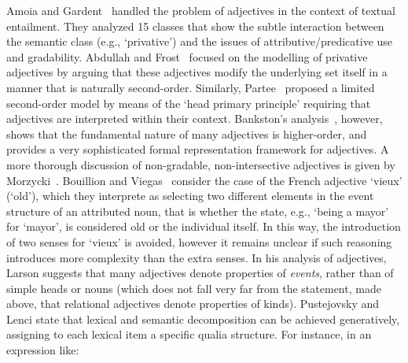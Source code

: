 \documentclass[11pt]{article}
\begin{document}
Amoia and Gardent~ handled the problem of adjectives in the context of textual entailment. They analyzed 15 classes that show the subtle interaction between the semantic class (e.g., `privative') and the issues of attributive/predicative use and gradability.  
Abdullah and Frost~ focused on the modelling of privative adjectives by arguing that these adjectives modify the underlying set itself in a manner that is naturally second-order. Similarly, Partee~ proposed a limited second-order model by means of the `head primary principle' requiring that adjectives are interpreted within their context. %
Bankston's analysis~, however, shows that the fundamental nature of many adjectives is higher-order, and provides a very sophisticated formal representation framework for adjectives. A more thorough discussion of non-gradable, non-intersective adjectives is given by Morzycki~.
Bouillion and Viegas~ consider the case of the French adjective `vieux' (`old'), which they interprete as selecting two different
elements in the event structure of an attributed noun, that is whether the
state, e.g., `being a mayor' for `mayor', is considered old or the individual
itself. In this way, the introduction of two senses for `vieux' is avoided, 
however it remains unclear if such reasoning introduces more complexity than
the extra senses. %
In his analysis of adjectives, Larson  suggests that many adjectives denote properties of \textit{events}, rather than of simple heads or nouns (which does not fall very far from the statement, made above, that relational adjectives denote properties of kinds). Pustejovsky  and Lenci  state that lexical and semantic decomposition can be achieved generatively, assigning to each lexical item a specific qualia structure. For instance, in an expression like:
\end{document}
